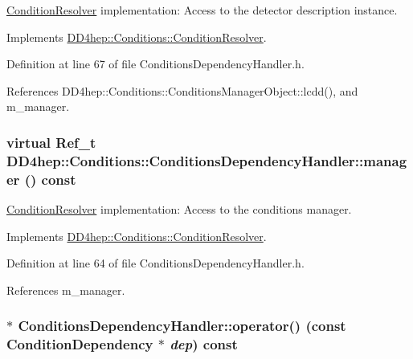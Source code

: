 \hyperlink{class_d_d4hep_1_1_conditions_1_1_condition_resolver}{ConditionResolver} implementation: Access to the detector description instance. 

Implements \hyperlink{class_d_d4hep_1_1_conditions_1_1_condition_resolver_a9413afdddefecd04036fd7f7b8356fca}{DD4hep::Conditions::ConditionResolver}.

Definition at line 67 of file ConditionsDependencyHandler.h.

References DD4hep::Conditions::ConditionsManagerObject::lcdd(), and m\_\-manager.\hypertarget{class_d_d4hep_1_1_conditions_1_1_conditions_dependency_handler_a2dde95f51874115f7a3c2ae055c7718b}{
\subsubsection[{manager}]{\setlength{\rightskip}{0pt plus 5cm}virtual {\bf Ref\_\-t} DD4hep::Conditions::ConditionsDependencyHandler::manager () const}}
\label{class_d_d4hep_1_1_conditions_1_1_conditions_dependency_handler_a2dde95f51874115f7a3c2ae055c7718b}


\hyperlink{class_d_d4hep_1_1_conditions_1_1_condition_resolver}{ConditionResolver} implementation: Access to the conditions manager. 

Implements \hyperlink{class_d_d4hep_1_1_conditions_1_1_condition_resolver_ab8c95a13c7c20b35ab746e6fcc8c420f}{DD4hep::Conditions::ConditionResolver}.

Definition at line 64 of file ConditionsDependencyHandler.h.

References m\_\-manager.\hypertarget{class_d_d4hep_1_1_conditions_1_1_conditions_dependency_handler_aed5f26afb531cb8f036efccfc9deeed1}{
\subsubsection[{operator()}]{ $\ast$ ConditionsDependencyHandler::operator() (const {\bf ConditionDependency} $\ast$ {\em dep}) const}}
\label{class_d_d4hep_1_1_conditions_1_1_conditions_dependency_handler_aed5f26afb531cb8f036efccfc9deeed1}


